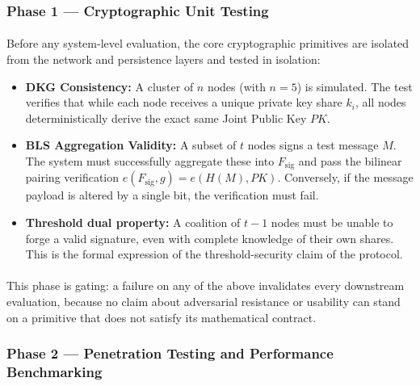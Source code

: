 \documentclass[a4paper]{scl-article}
\begin{document}
\subsubsection{Phase 1 --- Cryptographic Unit Testing}
\label{sect:meth4_b}
\paragraph{}Before any system-level evaluation, the core cryptographic primitives are isolated from the network and persistence layers and tested in isolation:
\begin{itemize}
    \item \textbf{DKG Consistency:} A cluster of $n$ nodes (with $n = 5$) is simulated. The test verifies that while each node receives a unique private key share $k_i$, all nodes deterministically derive the exact same Joint Public Key $PK$.
    \item \textbf{BLS Aggregation Validity:} A subset of $t$ nodes signs a test message $M$. The system must successfully aggregate these into $F_{\text{sig}}$ and pass the bilinear pairing verification $e(F_{\text{sig}}, g) = e(H(M), PK)$. Conversely, if the message payload is altered by a single bit, the verification must fail.
    \item \textbf{Threshold dual property:} A coalition of $t - 1$ nodes must be unable to forge a valid signature, even with complete knowledge of their own shares. This is the formal expression of the threshold-security claim of the protocol.
\end{itemize}
\paragraph{}This phase is gating: a failure on any of the above invalidates every downstream evaluation, because no claim about adversarial resistance or usability can stand on a primitive that does not satisfy its mathematical contract.

\subsubsection{Phase 2 --- Penetration Testing and Performance Benchmarking}
\label{sect:meth4_c}
\end{document}
